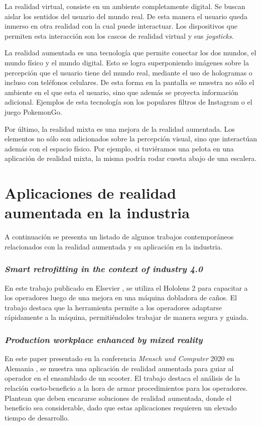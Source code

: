 
La realidad virtual, consiste en un ambiente completamente digital. Se buscan aislar los sentidos del usuario del mundo real. De esta manera el usuario queda inmerso en otra realidad con la cual puede interactuar. Los dispositivos que permiten esta interacción son los cascos de realidad virtual y sus \textit{joysticks}.

La realidad aumentada es una tecnología que permite conectar los dos mundos, el mundo físico y el mundo digital. Esto se logra superponiendo imágenes sobre la percepción que el usuario tiene del mundo real, mediante el uso de hologramas o incluso con teléfonos celulares. De esta forma en la pantalla se muestra no sólo el ambiente en el que esta el usuario, sino que además se proyecta información adicional. Ejemplos de esta tecnología son los populares filtros de Instagram o el juego PokemonGo.

Por último, la realidad mixta es una mejora de la realidad aumentada. Los elementos no sólo son adicionados sobre la percepción visual, sino que interactúan además con el espacio físico. Por ejemplo, si tuviéramos una pelota en una aplicación de realidad mixta, la misma podría rodar cuesta abajo de una escalera.

\section{Aplicaciones de realidad aumentada en la industria}

A continuación se presenta un listado de algunos trabajos contemporáneos relacionados con la realidad aumentada y su aplicación en la industria.

\subsubsection{\textit{Smart retrofitting in the context of industry 4.0}}
En este trabajo publicado en Elsevier \citep{MX1}, se utiliza el Hololens 2 para capacitar a los operadores luego de una mejora en una máquina dobladora de caños. El trabajo destaca que la herramienta permite a los operadores adaptarse rápidamente a la máquina, permitiéndoles trabajar de manera segura y guiada.

\subsubsection{\textit{Production workplace enhanced by mixed reality}}
En este paper presentado en la conferencia \textit{Mensch und Computer} 2020 en Alemania \citep{MX2}, se muestra una aplicación de realidad aumentada para guiar al operador en el ensamblado de un scooter. El trabajo destaca el análisis de la relación costo-beneficio a la hora de armar procedimientos para los operadores. Plantean que deben encararse soluciones de realidad aumentada, donde el beneficio sea considerable, dado que estas aplicaciones requieren un elevado tiempo de desarrollo.

